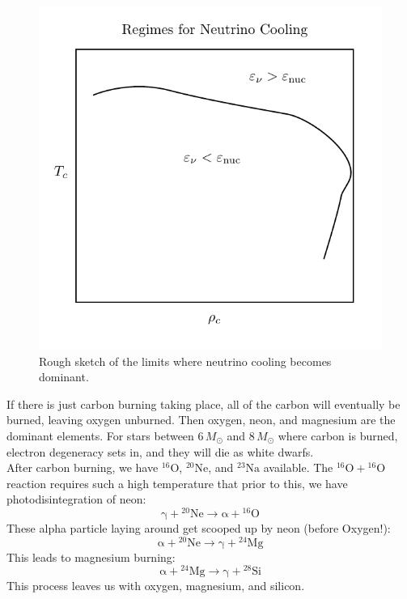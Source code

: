 \documentclass[10pt]{article}
\numberwithin{equation}{section}
\newcommand{\n}{\noindent}
\begin{document}
    \begin{figure}[h]
      \centering
      \includegraphics{neutrinoCool.pdf}
      \caption{Rough sketch of the limits where neutrino cooling becomes 
dominant.}
      \label{fig:cooling}
    \end{figure}
    \n If there is just carbon burning taking place, all of the carbon
    will eventually be burned, leaving oxygen unburned. Then oxygen,
    neon, and magnesium are the dominant elements. For stars between
    $6\,M_\odot$ and $8\,M_\odot$ where carbon is burned, electron
    degeneracy sets in, and they will die as white dwarfs.\\

    \n After carbon burning, we have ${}^{16}\mathrm{O}$,
    ${}^{20}\mathrm{Ne}$, and ${}^{23}\mathrm{Na}$ available. The
    ${}^{16}\mathrm{O}+{}^{16}\mathrm{O}$ reaction requires such a
    high temperature that prior to this, we have photodisintegration
    of neon:
    \begin{equation}
      \label{eq:361}
      \mathrm{\gamma+{}^{20}Ne\to \alpha+{}^{16}O}
    \end{equation}
    These alpha particle laying around get scooped up by neon (before
    Oxygen!):
    \begin{equation}
      \label{eq:362}
      \mathrm{\alpha+{}^{20}Ne\to\gamma+{}^{24}Mg}
    \end{equation}
    This leads to magnesium burning:
    \begin{equation}
      \label{eq:363}
      \mathrm{\alpha+{}^{24}Mg\to \gamma+{}^{28}Si}
    \end{equation}
    This process leaves us with oxygen, magnesium, and silicon.\\
    
\end{document}

